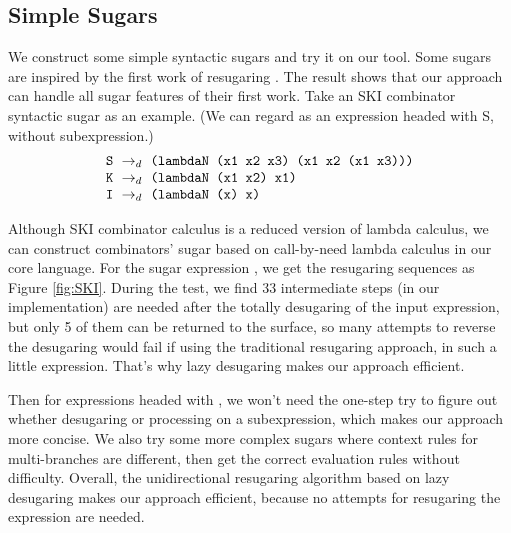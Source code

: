 \subsection{Simple Sugars}
\label{mark:simple}

We construct some simple syntactic sugars and try it on our tool. Some sugars are inspired by the first work of resugaring \cite{resugaring}. The result shows that our approach can handle all sugar features of their first work.
Take an SKI combinator syntactic sugar as an example. (We can regard  as an expression headed with S, without subexpression.)
\[
\begin{array}{l}
\mbox{\tt S} ~\rightarrow_d~ \texttt{(lambdaN (x1 x2 x3) (x1 x2 (x1 x3)))}\\
\mbox{\tt K} ~\rightarrow_d~ \texttt{(lambdaN (x1 x2) x1)}\\
\mbox{\tt I} ~\rightarrow_d~ \texttt{(lambdaN (x) x)}
\end{array}
\]




Although SKI combinator calculus is a reduced version of lambda calculus, we can construct combinators' sugar based on call-by-need lambda calculus in our core language. For the sugar expression , we get the resugaring sequences as Figure \ref{fig:SKI}. During the test, we find 33 intermediate steps (in our implementation) are needed after the totally desugaring of the input expression, but only 5 of them can be returned to the surface, so many attempts to reverse the desugaring would fail if using the traditional resugaring approach, in such a little expression. That's why lazy desugaring makes our approach efficient.







Then for expressions headed with , we won't need the one-step try to figure out whether desugaring or processing on a subexpression, which makes our approach more concise. We also try some more complex sugars where context rules for multi-branches are different, then get the correct evaluation rules without difficulty. Overall, the unidirectional resugaring algorithm based on lazy desugaring makes our approach efficient, because no attempts for resugaring the expression are needed.
